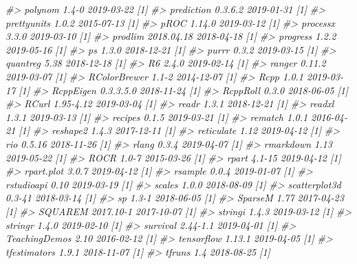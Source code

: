 \documentclass[]{krantz}
\makeatletter
\newenvironment{Shaded}{\begin{snugshade}}{\end{snugshade}}
\newcommand{\CommentTok}[1]{\textcolor[rgb]{0.37,0.37,0.37}{\textit{#1}}}
\newenvironment{kframe}{%
\medskip{}
\setlength{\fboxsep}{.8em}
 \def\at@end@of@kframe{}%
 \ifinner\ifhmode%
  \def\at@end@of@kframe{\end{minipage}}%
  \begin{minipage}{\columnwidth}%
 \fi\fi%
 \def\FrameCommand##1{\hskip\@totalleftmargin \hskip-\fboxsep
 \colorbox{shadecolor}{##1}\hskip-\fboxsep
     \hskip-\linewidth \hskip-\@totalleftmargin \hskip\columnwidth}%
 \MakeFramed {\advance\hsize-\width
   \@totalleftmargin\z@ \linewidth\hsize
   \@setminipage}}%
 {\par\unskip\endMakeFramed%
 \at@end@of@kframe}
\renewenvironment{Shaded}{\begin{kframe}}{\end{kframe}}
\makeatother
\begin{document}
\begin{Shaded}
\begin{Highlighting}[]
\CommentTok{#>    polynom         1.4-0      2019-03-22 [1]}
\CommentTok{#>    prediction      0.3.6.2    2019-01-31 [1]}
\CommentTok{#>    prettyunits     1.0.2      2015-07-13 [1]}
\CommentTok{#>    pROC            1.14.0     2019-03-12 [1]}
\CommentTok{#>    processx        3.3.0      2019-03-10 [1]}
\CommentTok{#>    prodlim         2018.04.18 2018-04-18 [1]}
\CommentTok{#>    progress        1.2.2      2019-05-16 [1]}
\CommentTok{#>    ps              1.3.0      2018-12-21 [1]}
\CommentTok{#>    purrr           0.3.2      2019-03-15 [1]}
\CommentTok{#>    quantreg        5.38       2018-12-18 [1]}
\CommentTok{#>    R6              2.4.0      2019-02-14 [1]}
\CommentTok{#>    ranger          0.11.2     2019-03-07 [1]}
\CommentTok{#>    RColorBrewer    1.1-2      2014-12-07 [1]}
\CommentTok{#>    Rcpp            1.0.1      2019-03-17 [1]}
\CommentTok{#>    RcppEigen       0.3.3.5.0  2018-11-24 [1]}
\CommentTok{#>    RcppRoll        0.3.0      2018-06-05 [1]}
\CommentTok{#>    RCurl           1.95-4.12  2019-03-04 [1]}
\CommentTok{#>    readr           1.3.1      2018-12-21 [1]}
\CommentTok{#>    readxl          1.3.1      2019-03-13 [1]}
\CommentTok{#>    recipes         0.1.5      2019-03-21 [1]}
\CommentTok{#>    rematch         1.0.1      2016-04-21 [1]}
\CommentTok{#>    reshape2        1.4.3      2017-12-11 [1]}
\CommentTok{#>    reticulate      1.12       2019-04-12 [1]}
\CommentTok{#>    rio             0.5.16     2018-11-26 [1]}
\CommentTok{#>    rlang           0.3.4      2019-04-07 [1]}
\CommentTok{#>    rmarkdown       1.13       2019-05-22 [1]}
\CommentTok{#>    ROCR            1.0-7      2015-03-26 [1]}
\CommentTok{#>    rpart           4.1-15     2019-04-12 [1]}
\CommentTok{#>    rpart.plot      3.0.7      2019-04-12 [1]}
\CommentTok{#>    rsample         0.0.4      2019-01-07 [1]}
\CommentTok{#>    rstudioapi      0.10       2019-03-19 [1]}
\CommentTok{#>    scales          1.0.0      2018-08-09 [1]}
\CommentTok{#>    scatterplot3d   0.3-41     2018-03-14 [1]}
\CommentTok{#>    sp              1.3-1      2018-06-05 [1]}
\CommentTok{#>    SparseM         1.77       2017-04-23 [1]}
\CommentTok{#>    SQUAREM         2017.10-1  2017-10-07 [1]}
\CommentTok{#>    stringi         1.4.3      2019-03-12 [1]}
\CommentTok{#>    stringr         1.4.0      2019-02-10 [1]}
\CommentTok{#>    survival        2.44-1.1   2019-04-01 [1]}
\CommentTok{#>    TeachingDemos   2.10       2016-02-12 [1]}
\CommentTok{#>    tensorflow      1.13.1     2019-04-05 [1]}
\CommentTok{#>    tfestimators    1.9.1      2018-11-07 [1]}
\CommentTok{#>    tfruns          1.4        2018-08-25 [1]}

\end{Highlighting}
\end{Shaded}
\end{document}
